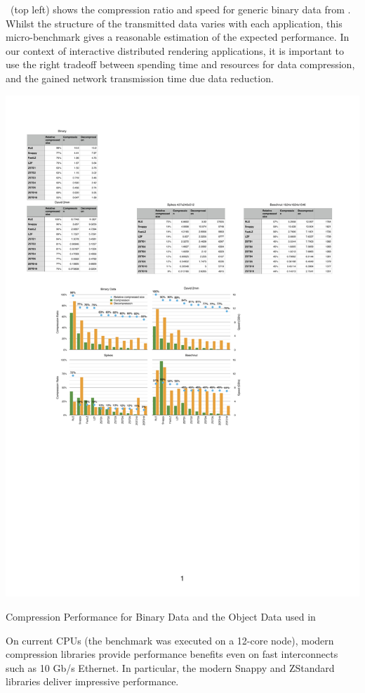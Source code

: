 ~(top left) shows the compression ratio and speed for
generic binary data from \cite{ESP:18}. Whilst the structure of the transmitted
data varies with each application, this micro-bench\-mark gives a reasonable
estimation of the expected performance. In our context of interactive
distributed rendering applications, it is important to use the right tradeoff
between spending time and resources for data compression, and the gained
network transmission time due data reduction.

\begin{benchmark}[h!t]\center
  \includegraphics[width=\textwidth]{results/compressorDetail}
  \caption{\label{rCompressorDetail}Compression Performance for Binary Data and the Object Data used in }
\end{benchmark}

On current CPUs (the benchmark was executed on a 12-core node), modern
compression libraries provide performance benefits even on fast interconnects
such as 10 Gb/s Ethernet. In particular, the modern Snappy and ZStandard
libraries deliver impressive performance.

